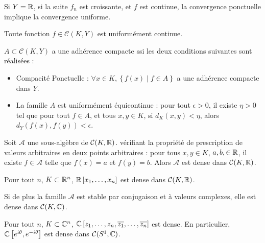\documentclass{cours}
\begin{document}
\begin{theorem}[De Dini]
    Si $Y = \mathbb{R}$, si la suite $f_{n}$ est croissante, et $f$ est continue, la convergence ponctuelle implique la convergence uniforme.
\end{theorem}

\begin{theorem}[De Heine]
    Toute fonction $f \in \mathcal{C}(K, Y)$ est uniformément continue.    
\end{theorem}

\begin{theorem}\label{thm:Ascoli}
    $A \subset \mathcal{C}(K, Y)$ a une adhérence compacte ssi les deux conditions suivantes sont réalisées : 
    \begin{itemize}
        \item Compacité Ponctuelle : $\forall x \in K, \left\{f(x)\mid f \in A\right\}$ a une adhérence compacte dans $Y$.
        \item La famille $A$ est uniformément équicontinue : pour tout $\epsilon > 0$, il existe $\eta > 0$ tel que pour tout $f \in A$, et tous $x, y \in K$, si $d_{K}(x, y) < \eta$, alors $d_{Y}(f(x), f(y)) < \epsilon$.
    \end{itemize}
\end{theorem}

\begin{theorem}\label{thm:Stone-Weierstrass}
    Soit $\mathcal{A}$ une sous-algèbre de $\mathcal{C}(K, \mathbb{R})$. vérifiant la propriété de prescription de valeurs arbitraires en deux points arbitraires : pour tous $x, y \in K$, $a, b,\in \mathbb{R}$, il existe $f \in \mathcal{A}$ telle que $f(x) = a$ et $f(y) = b$. Alors $\mathcal{A}$ est dense dans $\mathcal{C}(K, \mathbb{R})$.
\end{theorem}

\begin{corollary}
    Pour tout $n$, $K \subset \mathbb{R}^{n}$, $\mathbb{R}\left[x_{1}, \ldots, x_{n}\right]$ est dense dans $\mathcal{C}(K, \mathbb{R})$.
\end{corollary}

\begin{corollary}
    Si de plus la famille $\mathcal{A}$ est stable par conjugaison et à valeurs complexes, elle est dense dans $\mathcal{C}(K, \mathbb{C})$.    
\end{corollary}

\begin{corollary}
    Pour tout $n$, $K\subset \mathbb{C}^{n}$, $\mathbb{C}\left[z_{1}, \ldots, z_{n}, \overline{z_{1}}, \ldots, \overline{z_{n}}\right]$ est dense. En particulier, $\mathbb{C}\left[e^{i\theta}, e^{-i\theta}\right]$ est dense dans $\mathcal{C}(S^{1}, \mathbb{C})$.
\end{corollary}
\end{document}

